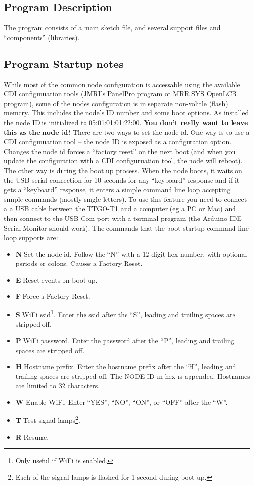 \documentclass[12pt,twoside]{article}
\begin{document}
\subsection{Program Description}

The program consists of a main sketch file, and several support files and
``components'' (libraries).

\subsection{Program Startup notes}

While most of the common node configuration is accessable using the available
CDI configuruation tools (JMRI's PanelPro program or MRR SYS OpenLCB program), 
some of the nodes configuration is in separate non-volitle (flash) memory.  
This includes the node's ID number and some boot options.  As installed the 
node ID is initialized to 05:01:01:01:22:00.  \textbf{You don't really want to 
leave this as the node id!}  There are two ways to set the node id.  One way 
is to use a CDI configuruation tool -- the node ID is exposed as a 
configuration option.  Changes the node id forces a ``factory reset'' on the 
next boot (and when you update the configuration with a CDI configuruation 
tool, the node will reboot).  The other way is during the boot up process.  
When the node boots, it waits on the USB serial connection for 10 seconds for 
any ``keyboard'' response and if it gets a ``keyboard'' response, it enters a 
simple command line loop accepting simple commands (mostly single letters). 
To use this feature you need to connect a a USB cable between the TTGO-T1 and 
a computer (eg a PC or Mac) and then connect to the USB Com port with a 
terminal program (the Arduino IDE Serial Monitor should work).  The commands 
that the boot startup command line loop supports are:

\begin{itemize}
\item \textbf{N} Set the node id.  Follow the ``N'' with a 12 digit hex 
number, with optional periods or colons.  Causes a Factory Reset.
\item \textbf{E} Reset events on boot up.
\item \textbf{F} Force a Factory Reset.
\item \textbf{S} WiFi ssid\footnote{Only useful if WiFi is 
enabled.\label{fn:wifi}}. Enter the ssid after the ``S'', leading and trailing 
spaces are stripped off.
\item \textbf{P} WiFi password. Enter the password after the 
``P'', leading and trailing spaces are stripped off.
\item \textbf{H} Hostname prefix. Enter the hostname prefix 
after the ``H'', leading and trailing spaces are stripped off. The NODE ID in 
hex is appended.  Hostnames are limited to 32 characters.
\item \textbf{W} Enable WiFi. Enter ``YES'', ``NO'', 
``ON'', or ``OFF'' after the ``W''.
\item \textbf{T} Test signal lamps\footnote{Each of the signal lamps is 
flashed for 1 second during boot up.}.
\item \textbf{R} Resume.
\end{itemize}
\end{document}
